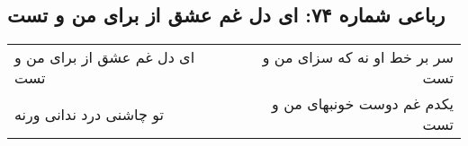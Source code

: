 \begin{center}
\section*{رباعی شماره ۷۴: ای دل غم عشق از برای من و تست}
\label{sec:sh074}
\begin{longtable}{l p{0.5cm} r}
ای دل غم عشق از برای من و تست
&&
سر بر خط او نه که سزای من و تست
\\
تو چاشنی درد ندانی ورنه
&&
یکدم غم دوست خونبهای من و تست
\\
\end{longtable}
\end{center}
